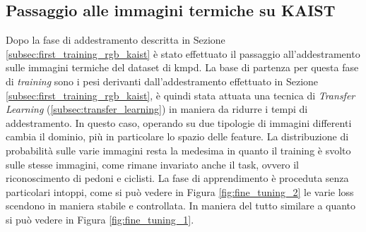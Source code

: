 \subsection{Passaggio alle immagini termiche su KAIST}
\label{subsec:rgb_to_thermal_kaist}
Dopo la fase di addestramento descritta in Sezione \ref{subsec:first_training_rgb_kaist} è stato effettuato il passaggio all'addestramento sulle immagini termiche del dataset di \ac{kmpd}. La base di partenza per questa fase di \textit{training} sono i pesi derivanti dall'addestramento effettuato in Sezione \ref{subsec:first_training_rgb_kaist}, è quindi stata attuata una tecnica di \textit{Transfer Learning} (\ref{subsec:transfer_learning}) in maniera da ridurre i tempi di addestramento. In questo caso, operando su due tipologie di immagini differenti cambia il dominio, più in particolare lo spazio delle feature. La distribuzione di probabilità sulle varie immagini resta la medesima in quanto il training è svolto sulle stesse immagini, come rimane invariato anche il task, ovvero il riconoscimento di pedoni e ciclisti.
La fase di apprendimento è proceduta senza particolari intoppi, come si può vedere in Figura \ref{fig:fine_tuning_2} le varie loss scendono in maniera stabile e controllata. In maniera del tutto similare a quanto si può vedere in Figura \ref{fig:fine_tuning_1}.

